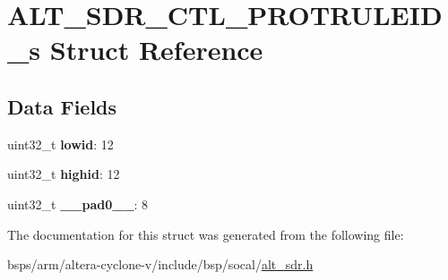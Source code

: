 \hypertarget{structALT__SDR__CTL__PROTRULEID__s}{}\section{A\+L\+T\+\_\+\+S\+D\+R\+\_\+\+C\+T\+L\+\_\+\+P\+R\+O\+T\+R\+U\+L\+E\+I\+D\+\_\+s Struct Reference}
\label{structALT__SDR__CTL__PROTRULEID__s}
\subsection*{Data Fields}
\begin{DoxyCompactItemize}
\item 
\mbox{\label{structALT__SDR__CTL__PROTRULEID__s_aef6b6d694b8b986f22e36f3d3557b04d}} 
uint32\+\_\+t {\bfseries lowid}\+: 12
\item 
\mbox{\label{structALT__SDR__CTL__PROTRULEID__s_a08a357022d45da675650627b77ac81ef}} 
uint32\+\_\+t {\bfseries highid}\+: 12
\item 
\mbox{\label{structALT__SDR__CTL__PROTRULEID__s_a06e28b1a6a3eaa7d17689b493c572355}} 
uint32\+\_\+t {\bfseries \+\_\+\+\_\+pad0\+\_\+\+\_\+}\+: 8
\end{DoxyCompactItemize}


The documentation for this struct was generated from the following file\+:\begin{DoxyCompactItemize}
\item 
bsps/arm/altera-\/cyclone-\/v/include/bsp/socal/\mbox{\hyperlink{alt__sdr_8h}{alt\+\_\+sdr.\+h}}\end{DoxyCompactItemize}
